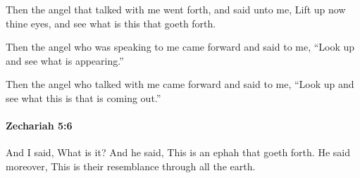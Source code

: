 			\begin{versebox}
					\item[BHS] 
					\item[LXX] 
					\item[ASV] Then the angel that talked with me went forth, and said unto me, Lift up now thine eyes, and see what is this that goeth forth.
					\item[NIV] Then the angel who was speaking to me came forward and said to me, “Look up and see what is appearing.”
					\item[NRSV] Then the angel who talked with me came forward and said to me, “Look up and see what this is that is coming out.”
			\end{versebox}

		\paragraph{Zechariah 5:6} %
			\label{ZECHARIAH-5-6}

			And I said, What is it? And he said, This is an ephah that goeth forth. He said moreover, This is their resemblance through all the earth.

